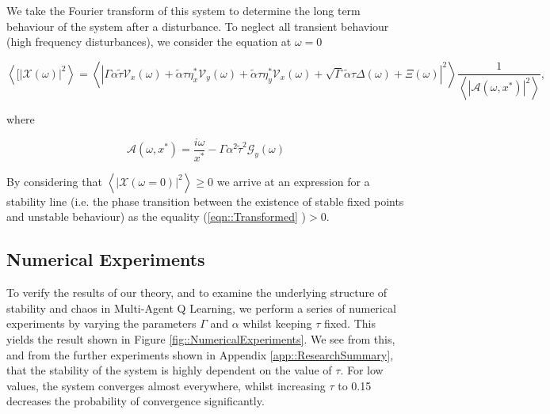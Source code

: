 \documentclass[.../main.tex]{subfiles}
\begin{document}
    We take the Fourier transform of this system to determine the long term behaviour of the system
    after a disturbance. To neglect all transient behaviour (high frequency disturbances), we
    consider the equation at $\omega = 0$

    \begin{equation} \label{eqn::Transformed}
    \left<[|\mathcal{X}(\omega)|^2 \right> = \left< | \Gamma \alpha \tilde{\tau} \mathcal{V}_x(\omega) + \tilde{\alpha} \tau \eta^*_x \mathcal{V}_y(\omega) + \tilde{\alpha} \tau \eta^*_y \mathcal{V}_x(\omega) + \sqrt{\Gamma} \tilde{\alpha} \tau \Delta(\omega) + \Xi(\omega) |^2 \right> \frac{1}{\left< |\mathcal{A}(\omega, x^*) |^2 \right>}, 
    \end{equation}


    where

    \begin{equation}
        \mathcal{A}(\omega, x^*) = \frac{i \omega}{x^*} - \Gamma \alpha^2 \tilde{\tau}^2 \mathcal{G}_y(\omega)
    \end{equation}

    By
    considering that $\left<|\mathcal{X}(\omega =
    0)|^2
    \right> \geq 0$  we arrive at an expression for a stability line (i.e. the phase transition
    between the
    existence of stable fixed points and unstable behaviour) as the equality (\ref{eqn::Transformed}
    )$>0$.


    \subsection{Numerical Experiments} %
    \label{sub:numerical_experiments}
    
    To verify the results of our theory, and to examine the underlying structure of stability and
    chaos in Multi-Agent Q Learning, we perform a series of numerical experiments by varying the
    parameters $\Gamma$ and $\alpha$ whilst keeping $\tau$ fixed. This yields the result shown in
    Figure \ref{fig::NumericalExperiments}. We see from this, and from the further experiments shown
    in Appendix \ref{app::ResearchSummary}, that the stability of the system is highly dependent on
    the value of $\tau$.
    For
    low values, the system converges almost everywhere, whilst increasing $\tau$ to 0.15 decreases
    the probability of convergence significantly.
\end{document}
